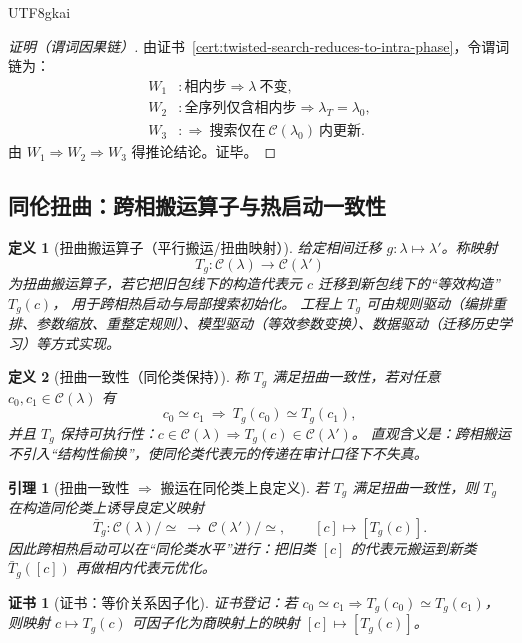 \documentclass[12pt]{article}
\newtheorem{definition}{定义}[section]
\newtheorem{lemma}{引理}[section]
\newtheorem{Certificate}{证书}[section]
\begin{document}
\begin{CJK*}{UTF8}{gkai}
\begin{proof}[证明（谓词因果链）]
由证书~\ref{cert:twisted-search-reduces-to-intra-phase}，令谓词链为：
\[
\begin{aligned}
  W_1 &: \text{相内步}\Rightarrow \lambda\ \text{不变},\\
  W_2 &: \text{全序列仅含相内步}\Rightarrow \lambda_T=\lambda_0,\\
  W_3 &: \Rightarrow\ \text{搜索仅在}\ \mathcal{C}(\lambda_0)\ \text{内更新}.
\end{aligned}
\]
由 $W_1\Rightarrow W_2\Rightarrow W_3$ 得推论结论。证毕。
\end{proof}

\subsection{同伦扭曲：跨相搬运算子与热启动一致性}
\label{sec:twisted-search-transport}

\begin{definition}[扭曲搬运算子（平行搬运/扭曲映射）]
给定相间迁移 $g:\lambda\mapsto\lambda'$。称映射
\[
  T_g:\mathcal{C}(\lambda)\to\mathcal{C}(\lambda')
\]
为扭曲搬运算子，若它把旧包线下的构造代表元 $c$ 迁移到新包线下的“等效构造”$T_g(c)$，
用于跨相热启动与局部搜索初始化。
工程上 $T_g$ 可由规则驱动（编排重排、参数缩放、重整定规则）、模型驱动（等效参数变换）、数据驱动（迁移历史学习）等方式实现。
\end{definition}

\begin{definition}[扭曲一致性（同伦类保持）]
称 $T_g$ 满足扭曲一致性，若对任意 $c_0,c_1\in\mathcal{C}(\lambda)$ 有
\[
  c_0\simeq c_1\ \Rightarrow\ T_g(c_0)\simeq T_g(c_1),
\]
并且 $T_g$ 保持可执行性：$c\in\mathcal{C}(\lambda)\Rightarrow T_g(c)\in\mathcal{C}(\lambda')$。
直观含义是：跨相搬运不引入“结构性偷换”，使同伦类代表元的传递在审计口径下不失真。
\end{definition}

\begin{lemma}[扭曲一致性 $\Rightarrow$ 搬运在同伦类上良定义]
\label{lem:transport-induces-map-on-homotopy-classes}
若 $T_g$ 满足扭曲一致性，则 $T_g$ 在构造同伦类上诱导良定义映射
\[
  \bar T_g:\mathcal{C}(\lambda)/\!\simeq\ \to\ \mathcal{C}(\lambda')/\!\simeq,
  \qquad
  [c]\mapsto [T_g(c)].
\]
因此跨相热启动可以在“同伦类水平”进行：把旧类 $[c]$ 的代表元搬运到新类 $\bar T_g([c])$ 再做相内代表元优化。
\end{lemma}

\begin{Certificate}[证书：等价关系因子化]
\label{cert:transport-induces-map-on-homotopy-classes}
证书登记：若 $c_0\simeq c_1\Rightarrow T_g(c_0)\simeq T_g(c_1)$，则映射 $c\mapsto T_g(c)$ 可因子化为商映射上的映射 $[c]\mapsto [T_g(c)]$。
\end{Certificate}


\end{CJK*}
\end{document}
